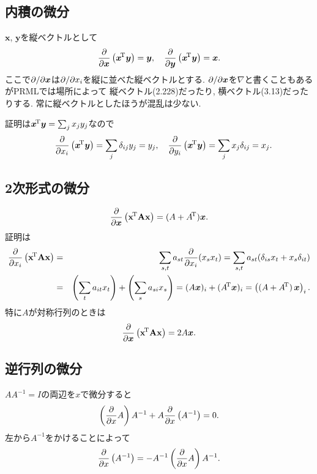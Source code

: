 \subsection{内積の微分}
$\bm{x}$, $\bm{y}$を縦ベクトルとして
$$
\frac{\partial}{\partial \bm{x}} \left({\bm{x}}^{\!\mathrm{T}}\bm{y}\right) = \bm{y},\quad
\frac{\partial}{\partial \bm{y}} \left({\bm{x}}^{\!\mathrm{T}}\bm{y}\right) = \bm{x}.
$$
\pagebreak
ここで$\partial/\partial \bm{x}$は$\partial/\partial x_i$を縦に並べた縦ベクトルとする.
$\partial/\partial \bm{x}$を$\nabla$と書くこともあるがPRMLでは場所によって
縦ベクトル(2.228)だったり, 横ベクトル(3.13)だったりする.
常に縦ベクトルとしたほうが混乱は少ない.

証明は${\bm{x}}^{\!\mathrm{T}}\bm{y}=\sum_j x_j y_j$なので
\begin{eqnarray*}&&
\frac{\partial}{\partial x_i}\left({\bm{x}}^{\!\mathrm{T}}\bm{y}\right)=\sum_j \delta_{ij} y_j=y_j,\quad
\frac{\partial}{\partial y_i}\left({\bm{x}}^{\!\mathrm{T}}\bm{y}\right)=\sum_j x_j \delta_{ij}=x_j.
\end{eqnarray*}
\vspace{0pt}

\subsection{2次形式の微分}
\begin{equation}\label{diff_quad}
\frac{\partial}{\partial \bm{x}}\left({\mathbf{\boldsymbol{x}}}^{\!\mathrm{T}} \mathbf{\boldsymbol{A}} \mathbf{\boldsymbol{x}}\right)=(A+{A}^{\!\mathrm{T}})\bm{x}.
\end{equation}
証明は
\begin{eqnarray*}
\frac{\partial}{\partial x_i}\left({\mathbf{\boldsymbol{x}}}^{\!\mathrm{T}} \mathbf{\boldsymbol{A}} \mathbf{\boldsymbol{x}}\right)
&=& \sum_{s,t} a_{st} \frac{\partial}{\partial x_i}(x_s x_t)= \sum_{s,t} a_{st} (\delta_{is} x_t + x_s \delta_{it})\\
&=& \left(\sum_t a_{it} x_t\right) + \left(\sum_s a_{si} x_s\right)
= (A\bm{x})_i + ({A}^{\!\mathrm{T}}\bm{x})_i = \left((A + {A}^{\!\mathrm{T}})\,\bm{x}\right)_i.
\end{eqnarray*}
特に$A$が対称行列のときは
$$\frac{\partial}{\partial \bm{x}}\left({\mathbf{\boldsymbol{x}}}^{\!\mathrm{T}} \mathbf{\boldsymbol{A}} \mathbf{\boldsymbol{x}}\right)=2A\bm{x}.$$
\vspace{0pt}

\subsection{逆行列の微分}
$AA^{-1}=I$の両辺を$x$で微分すると
$$\left(\frac{\partial}{\partial x} A\right)A^{-1}+A \frac{\partial}{\partial x}\left(A^{-1}\right)=0.$$
左から$A^{-1}$をかけることによって
\begin{equation}\label{diff_inv}
\frac{\partial}{\partial x}\left(A^{-1}\right)=-A^{-1}\left(\frac{\partial}{\partial x} A\right)A^{-1}.
\end{equation}
\vspace{0pt}

